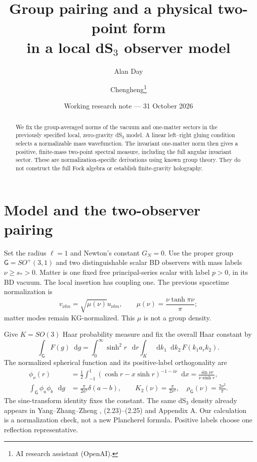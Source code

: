 \documentclass[11pt,a4paper]{article}
\title{Group pairing and a physical two-point form\\in a local dS$_3$ observer model}
\author{Alan Day \and Chengheng\thanks{AI research assistant (OpenAI).}}
\date{Working research note --- 31 October 2026}
\newcommand{\dd}{\mathop{}\!\mathrm d}
\begin{document}
\maketitle
\begin{abstract}
We fix the group-averaged norms of the vacuum and one-matter sectors
in the previously specified local, zero-gravity dS$_3$ model.
A linear left--right gluing condition selects a normalizable mass wavefunction.
The invariant one-matter norm then gives a positive, finite-mass two-point
spectral measure, including the full angular invariant sector.
These are normalization-specific derivations using known group theory.
They do not construct the full Fock algebra or establish finite-gravity holography.
\end{abstract}
\section{Model and the two-observer pairing}
Set the radius $\ell=1$ and Newton's constant $G_N=0$. Use the proper group
$\mathsf G=SO^+(3,1)$ and two distinguishable scalar BD observers
with mass labels $\nu\ge s_*>0$. Matter is one fixed free principal-series
scalar with label $p>0$, in its BD vacuum. The local insertion has coupling one.
The previous spacetime normalization is
\[
v_{\nu lm}=\sqrt{\mu(\nu)}u_{\nu lm},\qquad
\mu(\nu)=\frac{\nu\tanh\pi\nu}{\pi};
\]
matter modes remain KG-normalized. This $\mu$ is not a group density.

Give $K=SO(3)$ Haar probability measure and fix the overall Haar constant by
\begin{equation}
 \int_{\mathsf G}F(g)\dd g=
 \int_0^\infty\sinh^2r\,\dd r\int_K\dd k_1\dd k_2\,F(k_1a_rk_2).
\end{equation}
The normalized spherical function and its positive-label orthogonality are
\begin{align}
 \phi_\nu(r)&=\frac12\int_{-1}^1(\cosh r-x\sinh r)^{-1-i\nu}\dd x
 =\frac{\sin\nu r}{\nu\sinh r},\\
 \int_{\mathsf G}\phi_a\phi_b\,\dd g
 &=\frac{\pi}{2a^2}\delta(a-b),\qquad
 K_2(\nu)=\frac{\pi}{2\nu^2},\quad \rho_{\mathsf G}(\nu)=\frac{2\nu^2}{\pi}.
\end{align}
The sine-transform identity fixes the constant. The same dS$_3$ density
already appears in Yang--Zhang--Zheng \cite{YYZ}, (2.23)--(2.25) and Appendix A.
Our calculation is a normalization check, not a new Plancherel formula.
Positive labels choose one reflection representative.
\end{document}
